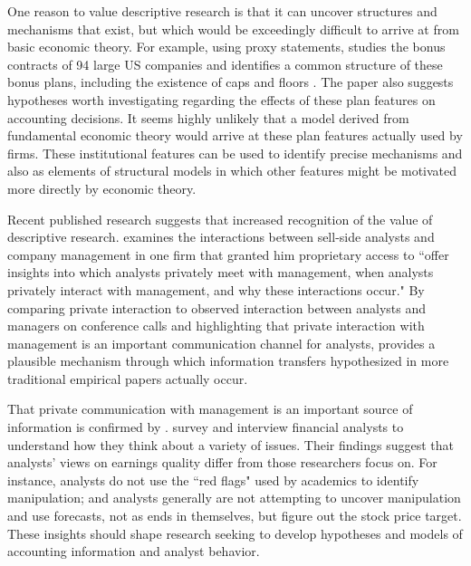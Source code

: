 \documentclass[11pt,reqno,titlepage]{amsart}
\begin{document}
\begin{doublespace}
One reason to value descriptive research is that it can uncover structures and mechanisms that exist, but which would be exceedingly difficult to arrive at from basic economic theory.
For example, using proxy statements, \citet{Healy:1985jg} studies the bonus contracts of 94 large US companies and identifies a common structure of these bonus plans, including the existence of caps and floors \citep[p.\,89]{Healy:1985jg}. The paper also suggests hypotheses worth investigating regarding the effects of these plan features on accounting decisions.
It seems highly unlikely that a model derived from fundamental economic theory would arrive at these plan features actually used by firms.
These institutional features can be used to identify precise mechanisms and also as elements of structural models in which other features might be motivated more directly by economic theory.

Recent published research suggests that increased recognition of the value of descriptive research.
\citet{Soltes:2013ba} examines the interactions between sell-side analysts and company management in one firm that granted him proprietary access to ``offer insights into which analysts privately meet with management, when analysts privately interact with management, and why these interactions occur."  
By comparing private interaction to observed interaction between analysts and managers on conference calls and highlighting that private interaction with management is an important communication channel for analysts, \citet{Soltes:2013ba} provides a plausible mechanism through which information transfers hypothesized in more traditional empirical papers actually occur.

That private communication with management is an important source of information is confirmed by  \citet{Brown:2015kd}. \citet{Brown:2015kd} survey and interview financial analysts to understand how they think about a variety of issues. 
Their findings suggest that analysts' views on earnings quality differ from those researchers focus on. 
For instance, analysts do not use the ``red flags" used by academics to identify manipulation; and analysts generally are not attempting to uncover manipulation and use forecasts, not as ends in themselves, but figure out the stock price target.
These insights should shape research seeking to develop hypotheses and models of accounting information and analyst behavior.


\end{doublespace}
\end{document}
